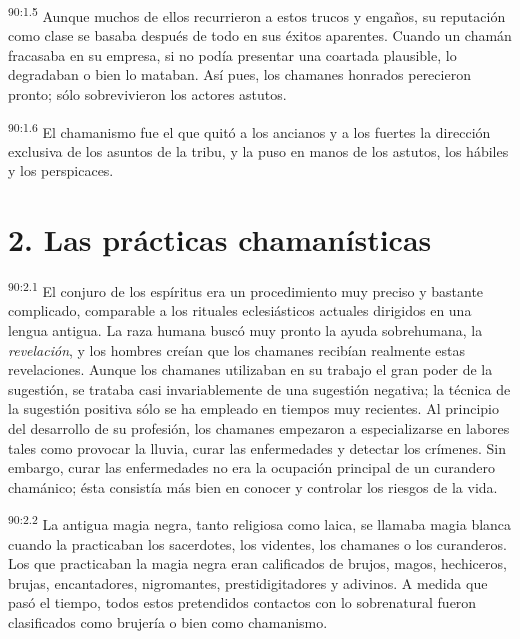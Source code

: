 \par
\textsuperscript{90:1.5} Aunque muchos de ellos recurrieron a estos trucos y engaños, su reputación como clase se basaba después de todo en sus éxitos aparentes. Cuando un chamán fracasaba en su empresa, si no podía presentar una coartada plausible, lo degradaban o bien lo mataban. Así pues, los chamanes honrados perecieron pronto; sólo sobrevivieron los actores astutos.

\par
\textsuperscript{90:1.6} El chamanismo fue el que quitó a los ancianos y a los fuertes la dirección exclusiva de los asuntos de la tribu, y la puso en manos de los astutos, los hábiles y los perspicaces.

\section*{2. Las prácticas chamanísticas}
\par
\textsuperscript{90:2.1} El conjuro de los espíritus era un procedimiento muy preciso y bastante complicado, comparable a los rituales eclesiásticos actuales dirigidos en una lengua antigua. La raza humana buscó muy pronto la ayuda sobrehumana, la \textit{revelación}, y los hombres creían que los chamanes recibían realmente estas revelaciones. Aunque los chamanes utilizaban en su trabajo el gran poder de la sugestión, se trataba casi invariablemente de una sugestión negativa; la técnica de la sugestión positiva sólo se ha empleado en tiempos muy recientes. Al principio del desarrollo de su profesión, los chamanes empezaron a especializarse en labores tales como provocar la lluvia, curar las enfermedades y detectar los crímenes. Sin embargo, curar las enfermedades no era la ocupación principal de un curandero chamánico; ésta consistía más bien en conocer y controlar los riesgos de la vida.

\par
\textsuperscript{90:2.2} La antigua magia negra, tanto religiosa como laica, se llamaba magia blanca cuando la practicaban los sacerdotes, los videntes, los chamanes o los curanderos. Los que practicaban la magia negra eran calificados de brujos, magos, hechiceros, brujas, encantadores, nigromantes, prestidigitadores y adivinos. A medida que pasó el tiempo, todos estos pretendidos contactos con lo sobrenatural fueron clasificados como brujería o bien como chamanismo.

